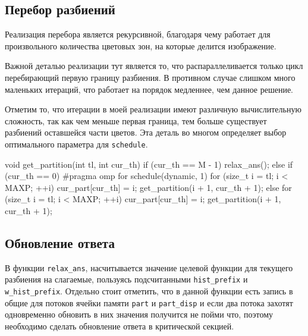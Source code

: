 \documentclass[14pt, russian, onesize]{extreport}
\begin{document}
\subsection*{Перебор разбиений}
Реализация перебора является рекурсивной, благодаря чему работает для 
произвольного количества цветовых зон, на которые делится изображение.

Важной деталью реализации тут является то, что распараллеливается только цикл
перебирающий первую границу разбиения. 
В противном случае слишком много маленьких итераций, что работает на порядок 
медленнее, чем данное решение. 

Отметим то, что итерации в моей реализации имеют
различную вычислительную сложность, так как чем меньше первая граница,
тем больше существует разбиений оставшейся части цветов. Эта деталь во многом
определяет выбор оптимального параметра для \texttt{schedule}.

\begin{cppcode}
void get_partition(int tl, int cur_th) {
    if (cur_th == M - 1) {
        relax_ans();
    } else if (cur_th == 0) {
#pragma omp for schedule(dynamic, 1)
        for (size_t i = tl; i < MAXP; ++i) {
            cur_part[cur_th] = i;
            get_partition(i + 1, cur_th + 1);
        }
    } else {
        for (size_t i = tl; i < MAXP; ++i) {
            cur_part[cur_th] = i;
            get_partition(i + 1, cur_th + 1);
        }
    }
}
\end{cppcode}
\subsection*{Обновление ответа}
В функции \texttt{relax\_ans}, насчитывается значение целевой функции для
текущего разбиения на слагаемые, пользуясь подсчитанными 
\texttt{hist\_prefix} и \texttt{w\_hist\_prefix}. Отдельно стоит отметить,
что в данной функции есть запись в общие для потоков ячейки памяти 
\texttt{part} и \texttt{part\_disp} и если два потока захотят одновременно
обновить в них значения получится не пойми что, поэтому необходимо сделать обновление 
ответа в критической секцией.
\end{document}
